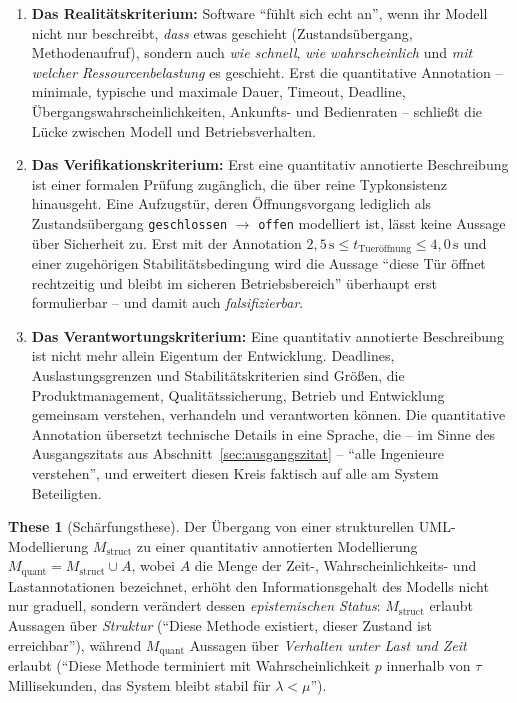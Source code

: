 ﻿\documentclass[a4paper,12pt]{report}
\theoremstyle{definition}
\newtheorem{these}{These}[section]
\begin{document}
\begin{enumerate}
  \item[(i)] \textbf{Das Realitätskriterium:} Software ``fühlt sich echt an'', wenn
  ihr Modell nicht nur beschreibt, \emph{dass} etwas geschieht (Zustandsübergang,
  Methodenaufruf), sondern auch \emph{wie schnell}, \emph{wie wahrscheinlich} und
  \emph{mit welcher Ressourcenbelastung} es geschieht. Erst die quantitative
  Annotation -- minimale, typische und maximale Dauer, Timeout, Deadline,
  Übergangswahrscheinlichkeiten, Ankunfts- und Bedienraten -- schließt die Lücke
  zwischen Modell und Betriebsverhalten.

  \item[(ii)] \textbf{Das Verifikationskriterium:} Erst eine quantitativ annotierte
  Beschreibung ist einer formalen Prüfung zugänglich, die über reine
  Typkonsistenz hinausgeht. Eine Aufzugstür, deren Öffnungsvorgang lediglich als
  Zustandsübergang \texttt{geschlossen} $\to$ \texttt{offen} modelliert ist, lässt
  keine Aussage über Sicherheit zu. Erst mit der Annotation
  $2{,}5\,\text{s} \le t_{\text{Tueröffnung}} \le 4{,}0\,\text{s}$ und einer
  zugehörigen Stabilitätsbedingung wird die Aussage ``diese Tür öffnet rechtzeitig
  und bleibt im sicheren Betriebsbereich'' überhaupt erst formulierbar -- und damit
  auch \emph{falsifizierbar}.

  \item[(iii)] \textbf{Das Verantwortungskriterium:} Eine quantitativ annotierte
  Beschreibung ist nicht mehr allein Eigentum der Entwicklung. Deadlines,
  Auslastungsgrenzen und Stabilitätskriterien sind Größen, die Produktmanagement,
  Qualitätssicherung, Betrieb und Entwicklung gemeinsam verstehen, verhandeln und
  verantworten können. Die quantitative Annotation übersetzt technische Details in
  eine Sprache, die -- im Sinne des Ausgangszitats aus
  Abschnitt~\ref{sec:ausgangszitat} -- ``alle Ingenieure verstehen'', und erweitert
  diesen Kreis faktisch auf alle am System Beteiligten.
\end{enumerate}

\begin{these}[Schärfungsthese]
\label{these:schaerfung}
Der Übergang von einer strukturellen UML-Modellierung
$M_{\mathrm{struct}}$ zu einer quantitativ annotierten Modellierung
$M_{\mathrm{quant}} = M_{\mathrm{struct}} \cup A$, wobei $A$ die Menge der
Zeit-, Wahrscheinlichkeits- und Lastannotationen bezeichnet, erhöht den
Informationsgehalt des Modells nicht nur graduell, sondern verändert dessen
\emph{epistemischen Status}: $M_{\mathrm{struct}}$ erlaubt Aussagen über
\emph{Struktur} (``Diese Methode existiert, dieser Zustand ist erreichbar''),
während $M_{\mathrm{quant}}$ Aussagen über \emph{Verhalten unter Last und Zeit}
erlaubt (``Diese Methode terminiert mit Wahrscheinlichkeit $p$ innerhalb von
$\tau$ Millisekunden, das System bleibt stabil für $\lambda < \mu$'').
\end{these}
\end{document}
